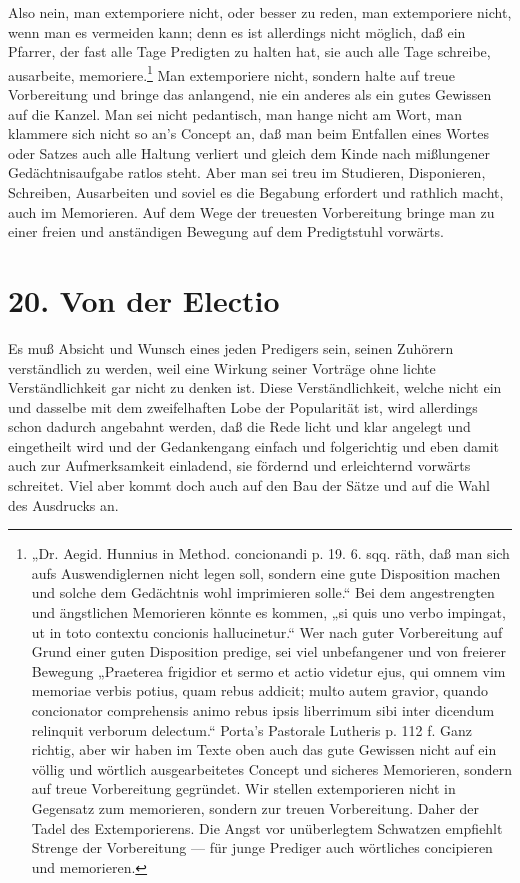 Also nein, man extemporiere nicht, oder besser zu reden, man extemporiere nicht, wenn man es vermeiden kann; denn es ist allerdings nicht möglich, daß ein Pfarrer, der fast alle Tage Predigten zu halten hat, sie auch alle Tage schreibe, ausarbeite, memoriere.\footnote{„Dr. Aegid. Hunnius in Method. concionandi p. 19. 6. sqq. räth, daß man sich aufs Auswendiglernen nicht legen soll, sondern eine gute Disposition machen und solche dem Gedächtnis wohl imprimieren solle.“ Bei dem angestrengten und ängstlichen Memorieren könnte es kommen, „si quis uno verbo impingat, ut in toto contextu concionis hallucinetur.“ Wer nach guter Vorbereitung auf Grund einer guten Disposition predige, sei viel unbefangener und von freierer Bewegung „Praeterea frigidior et sermo et actio videtur ejus, qui omnem vim memoriae verbis potius, quam rebus addicit; multo autem gravior, quando concionator comprehensis animo rebus ipsis liberrimum sibi inter dicendum relinquit verborum delectum.“ Porta's Pastorale Lutheris p. 112 f. Ganz richtig, aber wir haben im Texte oben auch das gute Gewissen nicht auf ein völlig und wörtlich ausgearbeitetes Concept und sicheres Memorieren, sondern auf treue Vorbereitung gegründet. Wir stellen extemporieren nicht in Gegensatz zum memorieren, sondern zur treuen Vorbereitung. Daher der Tadel des Extemporierens. Die Angst vor unüberlegtem Schwatzen empfiehlt Strenge der Vorbereitung — für junge Prediger auch wörtliches concipieren und memorieren.} Man extemporiere nicht, sondern
halte auf treue Vorbereitung und bringe das anlangend, nie ein anderes als ein gutes Gewissen auf die Kanzel. Man sei nicht pedantisch, man hange nicht am Wort, man klammere sich nicht so an's Concept an, daß man beim Entfallen eines Wortes oder Satzes auch alle Haltung verliert und gleich dem Kinde nach mißlungener Gedächtnisaufgabe ratlos steht. Aber man sei treu im Studieren, Disponieren, Schreiben, Ausarbeiten und soviel es die Begabung erfordert und rathlich macht, auch im Memorieren. Auf dem Wege der treuesten Vorbereitung bringe man zu einer freien und anständigen Bewegung auf dem Predigtstuhl vorwärts.

\section{20. Von der Electio}

Es muß Absicht und Wunsch eines jeden Predigers sein, seinen Zuhörern verständlich zu werden, weil eine Wirkung seiner Vorträge ohne lichte Verständlichkeit gar nicht zu denken ist. Diese Verständlichkeit, welche nicht ein und dasselbe mit dem zweifelhaften Lobe der Popularität ist, wird allerdings schon dadurch angebahnt werden, daß die Rede licht und klar angelegt und eingetheilt wird und der Gedankengang einfach und folgerichtig und eben damit auch zur Aufmerksamkeit einladend, sie fördernd und erleichternd vorwärts schreitet. Viel aber kommt doch auch auf den Bau der Sätze und auf die Wahl des Ausdrucks an.

